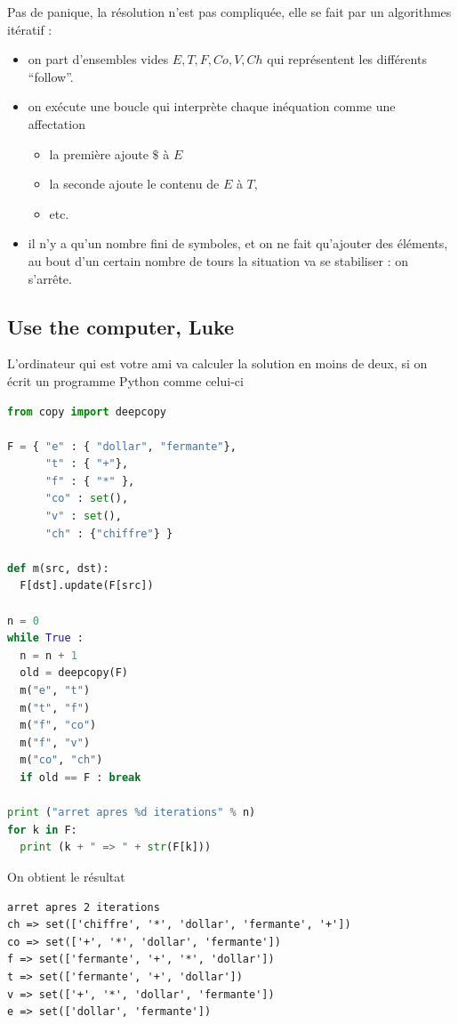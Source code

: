 {Pas de panique, la résolution n'est pas compliquée, elle se fait par
un algorithmes itératif :
\begin{itemize}
\item on part d'ensembles vides $E, T, F, Co, V, Ch$ qui représentent
les différents ``follow''.
\item on exécute une boucle qui interprète chaque inéquation comme
une affectation 
\begin{itemize}
\item la première ajoute $\$$ à $E$
\item la seconde ajoute le contenu de $E$ à $T$,
\item etc. 
\end{itemize}
\item il n'y a qu'un nombre fini de symboles, et on ne fait qu'ajouter des éléments, au bout d'un certain
nombre de tours la situation va se stabiliser : on s'arrête.
\end{itemize}


\subsection{Use the computer, Luke}

L'ordinateur qui est votre ami va calculer la solution
en moins de deux, si on écrit un programme Python comme celui-ci
\begin{lstlisting}[language=python, frame=single, numbers=right]
from copy import deepcopy

F = { "e" : { "dollar", "fermante"}, 
      "t" : { "+"}, 
      "f" : { "*" }, 
      "co" : set(), 
      "v" : set(), 
      "ch" : {"chiffre"} }

def m(src, dst):
  F[dst].update(F[src])

n = 0
while True :
  n = n + 1
  old = deepcopy(F)
  m("e", "t")
  m("t", "f")
  m("f", "co")
  m("f", "v")
  m("co", "ch")
  if old == F : break

print ("arret apres %d iterations" % n)
for k in F:
  print (k + " => " + str(F[k]))
\end{lstlisting}

On obtient le résultat
\begin{lstlisting}
arret apres 2 iterations
ch => set(['chiffre', '*', 'dollar', 'fermante', '+'])
co => set(['+', '*', 'dollar', 'fermante'])
f => set(['fermante', '+', '*', 'dollar'])
t => set(['fermante', '+', 'dollar'])
v => set(['+', '*', 'dollar', 'fermante'])
e => set(['dollar', 'fermante'])
\end{lstlisting}

}
